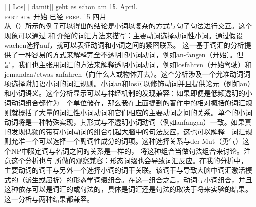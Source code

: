 \begin{exe}
\begin{xlist}[iv.]
\begin{exe}
\begin{xlist}[iv.]
\ex
\gll {}[ [ Los]        [ damit]]    geht es schon   am 15. April.\footnotemark\\
       {}        {}        \textsc{part}  {}        \textsc{adv} 开始 \expl{} 已经 \textsc{prep}. 15 四月\\%
%
\zl
从（）所示的例子可以得出的结论是小词以复杂的方式与句子句法进行交互。这个现象可以通过 和 介绍的词汇方法来描写：主要动词选择动词性小词。通过假设wachen选择auf，就可以表征动词和小词之间的紧密联系。 这一基于词汇的分析提供了一种容易的方式来解释完全不透明的小词动词，例如an-fangen（开始）。但是，我们也主张用词汇的方法来解释透明小词动词，例如losfahren（开始驾驶）和jemanden/etwas anfahren（向什么人或物体开去）。这个分析涉及一个允准动词词项选择附加语小词的词汇规则。小词an和los可以修饰动词并且提供论元（例如an）和小词语义。这个分析显示可以与神经机制的发现兼容：如果即便是低频透明的小词动词组合都作为一个单位储存，那么我在上面提到的著作中的相对概括的词汇规则就概括了大量的词汇性小词动词和它们相应的主要动词之间的关系。单个的小词动词将是一种特殊实现，其形式与不透明小词动词（例如anfangen）一致。如果真的发现低频的带有小词动词的组合引起大脑中的句法反应，这也可以解释：词汇规则允准一个可以选择一个副词性成分的词项。这种选择关系与der Mut（勇气）这个NP中限定词与名词之间的关系是一样的， \citet[]{CSP2010a}将这种组合当做句法组合来讨论。注意这个分析也与 \citet*{SPP2005a-u}所做的观察兼容：形态词缀也会导致词汇反应。在我的分析中，主要动词的词干与另外一个选择小词的词干关联。该词干与导致大脑中词汇激活模式的（派生或屈折）的形态学词缀组合。在这一组合之后，动词与小词组合，并且这种依存可以是词汇的或句法的，具体是词汇还是句法的取决于将来实验的结果。这一分析与两种结果都兼容。

\end{xlist}
\end{exe}
\end{xlist}
\end{exe}
